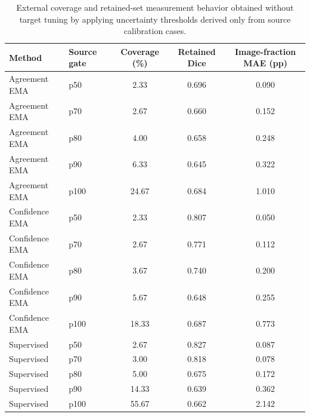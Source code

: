 
\begin{table}[t]
\centering
\caption{External coverage and retained-set measurement behavior obtained
without target tuning by applying uncertainty thresholds derived only from
source calibration cases.}
\label{tab:nb10_coverage_curve}
\begin{tabular}{llccc}
\toprule
Method &
Source gate &
Coverage (\%) &
Retained Dice &
Image-fraction MAE (pp) \\
\midrule
Agreement EMA & p50 & 2.33 & 0.696 & 0.090 \\
Agreement EMA & p70 & 2.67 & 0.660 & 0.152 \\
Agreement EMA & p80 & 4.00 & 0.658 & 0.248 \\
Agreement EMA & p90 & 6.33 & 0.645 & 0.322 \\
Agreement EMA & p100 & 24.67 & 0.684 & 1.010 \\
Confidence EMA & p50 & 2.33 & 0.807 & 0.050 \\
Confidence EMA & p70 & 2.67 & 0.771 & 0.112 \\
Confidence EMA & p80 & 3.67 & 0.740 & 0.200 \\
Confidence EMA & p90 & 5.67 & 0.648 & 0.255 \\
Confidence EMA & p100 & 18.33 & 0.687 & 0.773 \\
Supervised & p50 & 2.67 & 0.827 & 0.087 \\
Supervised & p70 & 3.00 & 0.818 & 0.078 \\
Supervised & p80 & 5.00 & 0.675 & 0.172 \\
Supervised & p90 & 14.33 & 0.639 & 0.362 \\
Supervised & p100 & 55.67 & 0.662 & 2.142 \\
\bottomrule
\end{tabular}
\end{table}

